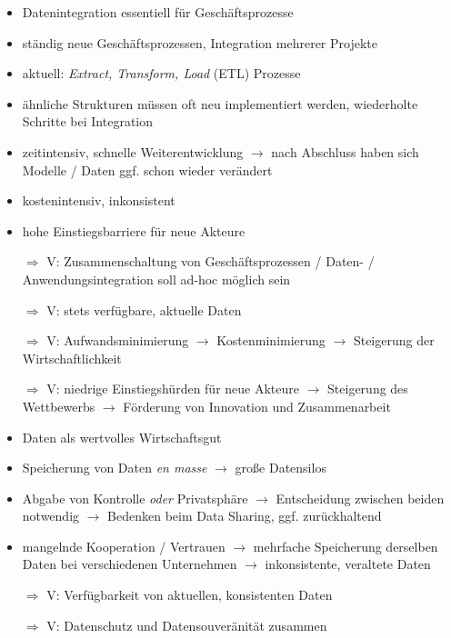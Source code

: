 \begin{itemize}
    \item Datenintegration essentiell für Geschäftsprozesse
    \item ständig neue Geschäftsprozessen, Integration mehrerer Projekte
    \item aktuell: \emph{Extract, Transform, Load} (ETL) Prozesse
    \item ähnliche Strukturen müssen oft neu implementiert werden, wiederholte Schritte bei Integration
    \item zeitintensiv, schnelle Weiterentwicklung $\to$ nach Abschluss haben sich Modelle / Daten ggf. schon wieder verändert
    \item kostenintensiv, inkonsistent
    \item hohe Einstiegsbarriere für neue Akteure
    \item[$\Rightarrow$] V: Zusammenschaltung von Geschäftsprozessen / Daten- / Anwendungsintegration soll ad-hoc möglich sein
    \item[$\Rightarrow$] V: stets verfügbare, aktuelle Daten
    \item[$\Rightarrow$] V: Aufwandsminimierung $\to$ Kostenminimierung $\to$ Steigerung der Wirtschaftlichkeit
    \item[$\Rightarrow$] V: niedrige Einstiegshürden für neue Akteure $\to$ Steigerung des Wettbewerbs $\to$ Förderung von Innovation und Zusammenarbeit
\end{itemize}

\vspace{1cm}

\begin{itemize}
    \item Daten als wertvolles Wirtschaftsgut
    \item Speicherung von Daten \emph{en masse} $\to$ große Datensilos
    \item Abgabe von Kontrolle \emph{oder} Privatsphäre $\to$ Entscheidung zwischen beiden notwendig $\to$ Bedenken beim Data Sharing, ggf. zurückhaltend
    \item mangelnde Kooperation / Vertrauen $\to$ mehrfache Speicherung derselben Daten bei verschiedenen Unternehmen $\to$ inkonsistente, veraltete Daten
    \item[$\Rightarrow$] V: Verfügbarkeit von aktuellen, konsistenten Daten
    \item[$\Rightarrow$] V: Datenschutz und Datensouveränität zusammen
\end{itemize}
